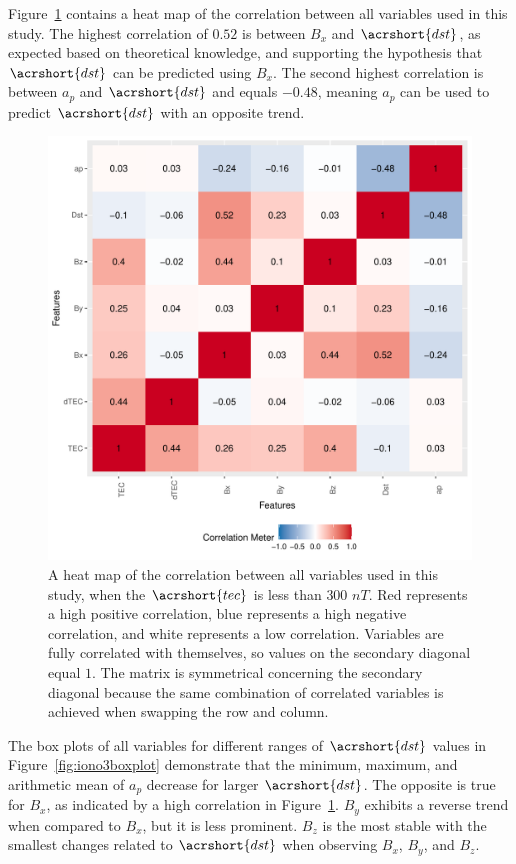 \documentclass[sn-mathphys-num]{sn-jnl}%
\begin{document}
Figure~\ref{fig:correlation} contains a heat map of the correlation between all variables used in this study. The highest correlation of $0.52$ is between $B_{x}$ and $\acrshort{dst}$, as expected based on theoretical knowledge, and supporting the hypothesis that $\acrshort{dst}$ can be predicted using $B_{x}$. The second highest correlation is between $a_{p}$ and $\acrshort{dst}$ and equals $-0.48$, meaning $a_{p}$ can be used to predict  $\acrshort{dst}$ with an opposite trend.

\begin{figure}
 \centering
 \includegraphics[width=0.9\linewidth]{iono3correlation.pdf}
    \caption{A heat map of the correlation between all variables used in this study, when the $\acrshort{tec}$ is less than $300$ $nT$. Red represents a high positive correlation, blue represents a high negative correlation, and white represents a low correlation. Variables are fully correlated with themselves, so values on the secondary diagonal equal $1$. The matrix is symmetrical concerning the secondary diagonal because the same combination of correlated variables is achieved when swapping the row and column.}
    \label{fig:correlation}
\end{figure}

The box plots of all variables for different ranges of $\acrshort{dst}$ values in Figure~\ref{fig:iono3boxplot} demonstrate that the minimum, maximum, and arithmetic mean of $a_{p}$ decrease for larger $\acrshort{dst}$. The opposite is true for $B_{x}$, as indicated by a high correlation in Figure~\ref{fig:correlation}. $B_{y}$ exhibits a reverse trend when compared to $B_{x}$, but it is less prominent. $B_{z}$ is the most stable with the smallest changes related to $\acrshort{dst}$ when observing $B_{x}$, $B_{y}$, and $B_{z}$.
\end{document}
